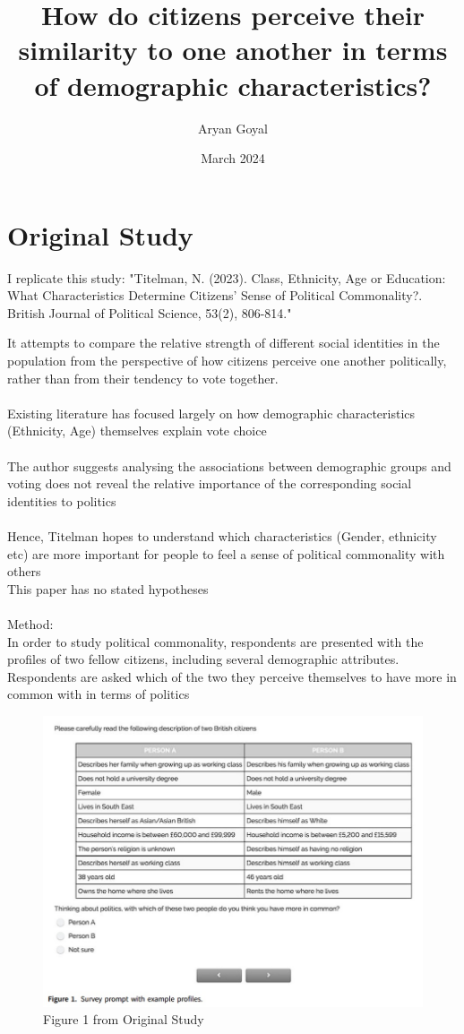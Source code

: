\documentclass{article}
\title{How do citizens perceive their similarity to one another in terms of demographic characteristics?}
\author{Aryan Goyal}
\date{March 2024}
\begin{document}
\maketitle

\section{Original Study}
I replicate this study: "Titelman, N. (2023). Class, Ethnicity, Age or Education: What Characteristics Determine Citizens' Sense of Political Commonality?. British Journal of Political Science, 53(2), 806-814."

It attempts to compare the relative strength of different social identities in the population from the perspective of how citizens perceive one another politically, rather than from their tendency to vote together.
\\
\\
Existing literature has focused largely on how demographic
characteristics (Ethnicity,  Age) themselves explain vote choice
\\
\\
The author suggests analysing the associations between demographic groups 
and voting does not reveal the relative importance of the corresponding 
social identities to politics
\\
\\
Hence, Titelman hopes to understand which characteristics (Gender, 
ethnicity etc) are more important for people to feel a sense of political 
commonality with others
\\
This paper has no stated hypotheses
\\
\\
Method:
\\
In order to study political commonality, respondents are presented with the profiles of two fellow citizens, including several demographic attributes.
\\
Respondents are asked which of the two they perceive themselves to have more in common with in terms of politics
\begin{figure} [H]
    \centering
    \includegraphics[width=1.3\textwidth]{Figure 1.jpg}
    \caption{Figure 1 from Original Study}
    \label{fig:enter-label}
\end{figure}
\end{document}
